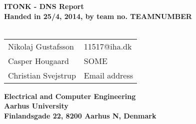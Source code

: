 
\begin{titlepage}
\begin{center}
{\LARGE \textbf{ITONK - DNS Report}}\\


\vspace{4cm}
\textbf{Handed in 25/4, 2014, by team no. TEAMNUMBER}\\~\\
\begin{tabular}{ll}
Nikolaj Gustafsson  & 11517@iha.dk \\
Casper Hougaard  & SOME \\
Christian Svejstrup  & Email address \\
\end{tabular}
\vfill
\textbf{Electrical and Computer Engineering}\\
\textbf{Aarhus University}\\
\textbf{Finlandsgade 22, 8200 Aarhus N, Denmark}
\end{center}
\end{titlepage}